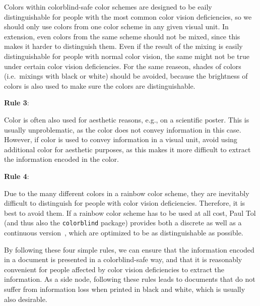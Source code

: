 \documentclass{scrartcl}
\begin{document}
Colors within colorblind-safe color schemes are designed to be eaily distinguishable for people with the most common color vision deficiencies, so we should only use colors from one color scheme in any given visual unit.
In extension, even colors from the same scheme should not be mixed, since this makes it harder to distinguish them.
Even if the result of the mixing is easily distinguishable for people with normal color vision, the same might not be true under certain color vision deficiencies.
For the same reaseon, shades of colors (i.e.\ mixings with black or white) should be avoided, because the brightness of colors is also used to make sure the colors are distinguishable.

\begin{center}
	\setlength{\fboxrule}{1pt}
	\textbf{Rule 3}:
\end{center}

Color is often also used for aesthetic reasons, e.g., on a scientific poster.
This is usually unproblematic, as the color does not convey information in this case.
However, if color is used to convey information in a visual unit, avoid using additional color for aesthetic purposes, as this makes it more difficult to extract the information encoded in the color.

\begin{center}
	\setlength{\fboxrule}{1pt}
	\textbf{Rule 4}:
\end{center}

Due to the many different colors in a rainbow color scheme, they are inevitably difficult to distinguish for people with color vision deficiencies.
Therefore, it is best to avoid them.
If a rainbow color scheme has to be used at all cost, Paul Tol (and thus also the \texttt{colorblind} package) provides both a discrete as well as a continuous version~\cite{Tol}, which are optimized to be as distinguishable as possible.

By following these four simple rules, we can ensure that the information encoded in a document is presented in a colorblind-safe way, and that it is reasonably convenient for people affected by color vision deficiencies to extract the information.
As a side node, following these rules leads to documents that do not suffer from information loss when printed in black and white, which is usually also desirable.
\end{document}
